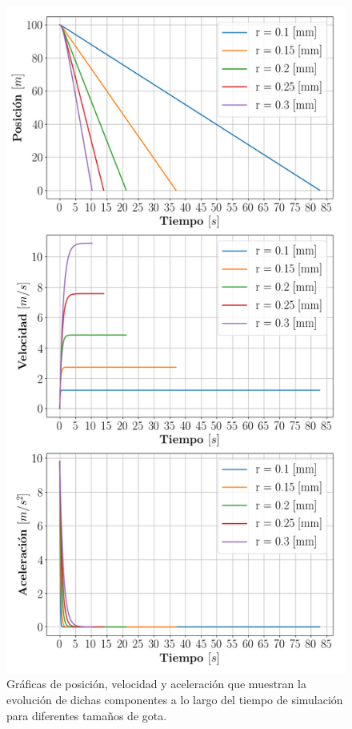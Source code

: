 \documentclass[journal]{IEEEtran}
\begin{document}
\newpage

\begin{figure}[!htb]
	\centering
	\includegraphics[width=1\linewidth]{graficas_radio}
	\caption{Gráficas de posición, velocidad y aceleración que muestran la evolución de dichas componentes a lo largo del tiempo de simulación para diferentes tamaños de gota.}
  \label{fig:radio}
\end{figure}
\end{document}
